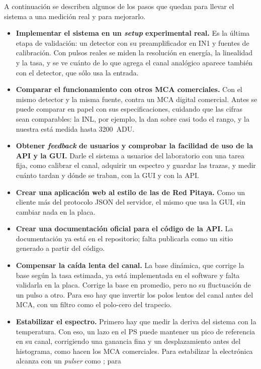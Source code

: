 A continuación se describen algunos de los pasos que quedan para llevar el
sistema a una medición real y para mejorarlo.
\begin{itemize}
  \item \textbf{Implementar el sistema en un \emph{setup} experimental real.} Es la
    última etapa de validación: un detector con su preamplificador en IN1 y
    fuentes de calibración. Con pulsos reales se miden la resolución en energía,
    la linealidad y la tasa, y se ve cuánto de lo que agrega el canal analógico
    aparece también con el detector, que sólo usa la entrada.
  \item \textbf{Comparar el funcionamiento con otros MCA comerciales.} Con el
    mismo detector y la misma fuente, contra un MCA digital comercial. Antes se
    puede comparar en papel con sus especificaciones, cuidando que las cifras
    sean comparables: la INL, por ejemplo, la dan sobre casi todo el rango, y la
    nuestra está medida hasta 3200~ADU.
  \item \textbf{Obtener \emph{feedback} de usuarios y comprobar la facilidad de uso de
    la API y la GUI.} Darle el sistema a usuarios del laboratorio con una tarea
    fija, como calibrar el canal, adquirir un espectro y guardar las trazas, y
    medir cuánto tardan y dónde se traban, con la GUI y con la API.
  \item \textbf{Crear una aplicación web al estilo de las de Red Pitaya.} Como un
    cliente más del protocolo JSON del servidor, el mismo que usa la GUI, sin
    cambiar nada en la placa.
  \item \textbf{Crear una documentación oficial para el código de la API.} La
    documentación ya está en el repositorio; falta publicarla como un sitio
    generado a partir del código.
  \item \textbf{Compensar la caída lenta del canal.} La base dinámica, que
    corrige la base según la tasa estimada, ya está implementada en el software y
    falta validarla en la placa. Corrige la base en promedio, pero no su
    fluctuación de un pulso a otro. Para eso hay que invertir los polos lentos
    del canal antes del MCA, con un filtro como el polo-cero del trapecio.
  \item \textbf{Estabilizar el espectro.} Primero hay que medir la deriva del
    sistema con la temperatura. Con eso, un lazo en el PS puede mantener un pico
    de referencia en su canal, corrigiendo una ganancia fina y un desplazamiento
    antes del histograma, como hacen los MCA comerciales. Para estabilizar la
    electrónica alcanza con un \emph{pulser} como ; para

\end{itemize}
